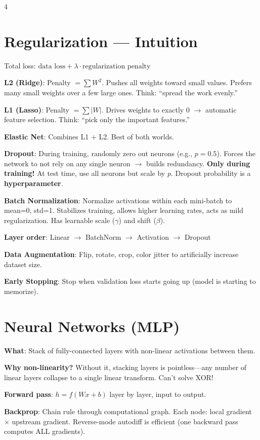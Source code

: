 \documentclass[6pt,landscape,a4paper]{extarticle}
\begin{document}
\begin{multicols}{4}
\section{Regularization --- Intuition}

Total loss: $\text{data loss} + \lambda \cdot \text{regularization penalty}$

\textbf{L2 (Ridge)}: Penalty $= \sum W^2$. Pushes all weights toward small values. Prefers many small weights over a few large ones. Think: ``spread the work evenly.''

\textbf{L1 (Lasso)}: Penalty $= \sum |W|$. Drives weights to exactly 0 $\to$ automatic feature selection. Think: ``pick only the important features.''

\textbf{Elastic Net}: Combines L1 + L2. Best of both worlds.

\textbf{Dropout}: During training, randomly zero out neurons (e.g., $p=0.5$). Forces the network to not rely on any single neuron $\to$ builds redundancy. \textbf{Only during training!} At test time, use all neurons but scale by $p$. Dropout probability is a \textbf{hyperparameter}.

\textbf{Batch Normalization}: Normalize activations within each mini-batch to mean=0, std=1. Stabilizes training, allows higher learning rates, acts as mild regularization. Has learnable scale ($\gamma$) and shift ($\beta$).

\textbf{Layer order}: Linear $\to$ BatchNorm $\to$ Activation $\to$ Dropout

\textbf{Data Augmentation}: Flip, rotate, crop, color jitter to artificially increase dataset size.

\textbf{Early Stopping}: Stop when validation loss starts going up (model is starting to memorize).

\section{Neural Networks (MLP)}

\textbf{What}: Stack of fully-connected layers with non-linear activations between them.

\textbf{Why non-linearity?} Without it, stacking layers is pointless---any number of linear layers collapse to a single linear transform. Can't solve XOR!

\textbf{Forward pass}: $h = f(Wx + b)$ layer by layer, input to output.

\textbf{Backprop}: Chain rule through computational graph. Each node: local gradient $\times$ upstream gradient. Reverse-mode autodiff is efficient (one backward pass computes ALL gradients).


\end{multicols}
\end{document}
